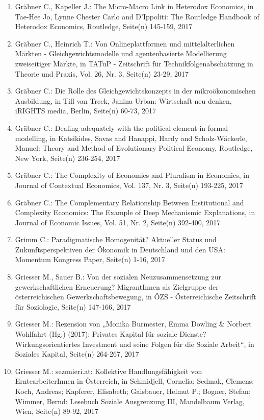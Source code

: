 \begin{enumerate}
	 \item Gräbner C., Kapeller J.: The Micro-Macro Link in Heterodox Economics, in Tae-Hee Jo, Lynne Chester Carlo and D'Ippoliti: The Routledge Handbook of Heterodox Economics, Routledge, Seite(n) 145-159, 2017
	 \item Gräbner C., Heinrich T.: Von Onlineplattformen und mittelalterlichen Märkten - Gleichgewichtsmodelle und agentenbasierte Modellierung zweiseitiger Märkte, in TATuP - Zeitschrift für Technikfolgenabschätzung in Theorie und Praxis, Vol. 26, Nr. 3, Seite(n) 23-29, 2017
	 \item Gräbner C.: Die Rolle des Gleichgewichtskonzepts in der mikroökonomischen Ausbildung, in Till van Treek, Janina Urban: Wirtschaft neu denken, iRIGHTS media, Berlin, Seite(n) 60-73, 2017
	 \item Gräbner C.: Dealing adequately with the political element in formal modelling, in Katsikides, Savas and Hanappi, Hardy and Scholz-Wäckerle, Manuel: Theory and Method of Evolutionary Political Economy, Routledge, New York, Seite(n) 236-254, 2017
	 \item Gräbner C.: The Complexity of Economies and Pluralism in Economics, in Journal of Contextual Economics, Vol. 137, Nr. 3, Seite(n) 193-225, 2017
	 \item Gräbner C.: The Complementary Relationship Between Institutional and Complexity Economics: The Example of Deep Mechanismic Explanations, in Journal of Economic Issues, Vol. 51, Nr. 2, Seite(n) 392-400, 2017
	 \item Grimm C.: Paradigmatische Homogenität? Aktueller Status und Zukunftsperspektiven der Ökonomik in Deutschland und den USA: Momentum Kongress Paper, Seite(n) 1-16, 2017
	 \item Griesser M., Sauer B.: Von der sozialen Neuzusammensetzung zur gewerkschaftlichen Erneuerung? MigrantInnen als Zielgruppe der österreichischen Gewerkschaftsbewegung, in ÖZS - Österreichische Zeitschrift für Soziologie, Seite(n) 147-166, 2017
	 \item Griesser M.: Rezension von „Monika Burmester, Emma Dowling \& Norbert Wohlfahrt (Hg.) (2017): Privates Kapital für soziale Dienste? Wirkungsorientiertes Investment und seine Folgen für die Soziale Arbeit“, in Soziales Kapital, Seite(n) 264-267, 2017
	 \item Griesser M.: sezonieri.at: Kollektive Handlungsfähigkeit von ErntearbeiterInnen in Österreich, in Schmidjell, Cornelia; Sedmak, Clemens; Koch, Andreas; Kapferer, Elisabeth; Gaisbauer, Helmut P.; Bogner, Stefan; Wimmer, Bernd: Lesebuch Soziale Ausgrenzung III, Mandelbaum Verlag, Wien, Seite(n) 89-92, 2017

\end{enumerate}

